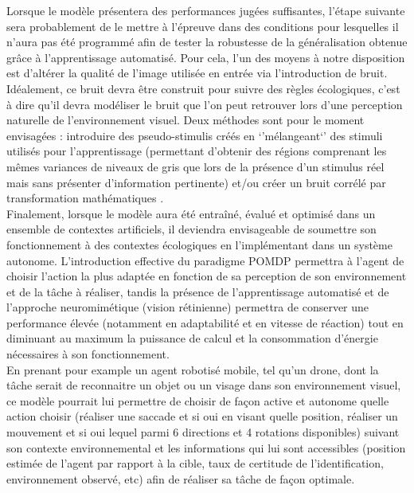 Lorsque le modèle présentera des performances jugées suffisantes, l'étape suivante sera probablement de le mettre à l'épreuve dans des conditions pour lesquelles il n'aura pas été programmé afin de tester la robustesse de la généralisation obtenue grâce à l'apprentissage automatisé. Pour cela, l'un des moyens à notre disposition est d'altérer la qualité de l'image utilisée en entrée via l'introduction de bruit. 
Idéalement, ce bruit devra être construit pour suivre des règles écologiques, c'est à dire qu'il devra modéliser le bruit que l'on peut retrouver lors d'une perception naturelle de l'environnement visuel. Deux méthodes sont pour le moment envisagées : introduire des pseudo-stimulis créés en `'mélangeant`' des stimuli utilisés pour l'apprentissage (permettant d'obtenir des régions comprenant les mêmes variances de niveaux de gris que lors de la présence d'un stimulus réel mais sans présenter d'information pertinente) et/ou créer un bruit corrélé par transformation mathématiques \autocite{Najemnik2005}. \\

Finalement, lorsque le modèle aura été entraîné, évalué et optimisé dans un ensemble de contextes artificiels, il deviendra envisageable de soumettre son fonctionnement à des contextes écologiques en l'implémentant dans un système autonome.
L'introduction effective du paradigme POMDP permettra à l'agent de choisir l'action la plus adaptée en fonction de sa perception de son environnement et de la tâche à réaliser, tandis la présence de l'apprentissage automatisé et de l'approche neuromimétique (vision rétinienne) permettra de conserver une performance élevée (notamment en adaptabilité et en vitesse de réaction) tout en diminuant au maximum la puissance de calcul et la consommation d'énergie nécessaires à son fonctionnement. \autocite{Potthast2016} \\
En prenant pour example un agent robotisé mobile, tel qu'un drone, dont la tâche serait de reconnaitre un objet ou un visage dans son environnement visuel, ce modèle pourrait lui permettre de choisir de façon active et autonome quelle action choisir (réaliser une saccade et si oui en visant quelle position, réaliser un mouvement et si oui lequel parmi 6 directions et 4 rotations disponibles) suivant son contexte environnemental et les informations qui lui sont accessibles (position estimée de l'agent par rapport à la cible, taux de certitude de l'identification, environnement observé, etc) afin de réaliser sa tâche de façon optimale. \autocite{Potthast2016} \\